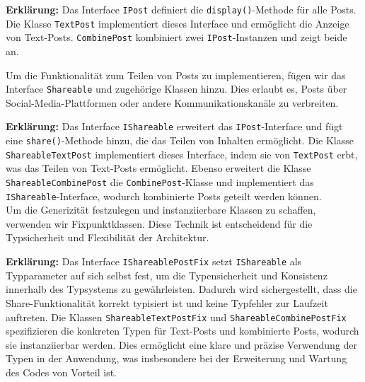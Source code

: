\documentclass{easychair}
\begin{document}


\noindent \textbf{Erklärung:} Das Interface \texttt{IPost} definiert die \texttt{display()}-Methode für alle Posts. Die Klasse \texttt{TextPost} implementiert dieses Interface und ermöglicht die Anzeige von Text-Posts. \texttt{CombinePost} kombiniert zwei \texttt{IPost}-Instanzen und zeigt beide an.


Um die Funktionalität zum Teilen von Posts zu implementieren, fügen wir das Interface \texttt{Shareable} und zugehörige Klassen hinzu. Dies erlaubt es, Posts über Social-Media-Plattformen oder andere Kommunikationskanäle zu verbreiten.



\noindent \textbf{Erklärung:} Das Interface \texttt{IShareable} erweitert das \texttt{IPost}-Interface und fügt eine \texttt{share()}-Methode hinzu, die das Teilen von Inhalten ermöglicht. Die Klasse \texttt{ShareableTextPost} implementiert dieses Interface, indem sie von \texttt{TextPost} erbt, was das Teilen von Text-Posts ermöglicht. Ebenso erweitert die Klasse \texttt{ShareableCombinePost} die \texttt{CombinePost}-Klasse und implementiert das \texttt{IShareable}-Interface, wodurch kombinierte Posts geteilt werden können.\\

Um die Generizität festzulegen und instanziierbare Klassen zu schaffen, verwenden wir Fixpunktklassen. Diese Technik ist entscheidend für die Typsicherheit und Flexibilität der Architektur.



\noindent \textbf{Erklärung:} Das Interface \texttt{IShareablePostFix} setzt \texttt{IShareable} als Typparameter auf sich selbst fest, um die Typensicherheit und Konsistenz innerhalb des Typsystems zu gewährleisten. Dadurch wird sichergestellt, dass die Share-Funktionalität korrekt typisiert ist und keine Typfehler zur Laufzeit auftreten. Die Klassen \texttt{ShareableTextPostFix} und \texttt{ShareableCombinePostFix} spezifizieren die konkreten Typen für Text-Posts und kombinierte Posts, wodurch sie instanziierbar werden. Dies ermöglicht eine klare und präzise Verwendung der Typen in der Anwendung, was insbesondere bei der Erweiterung und Wartung des Codes von Vorteil ist.\\
\end{document}
